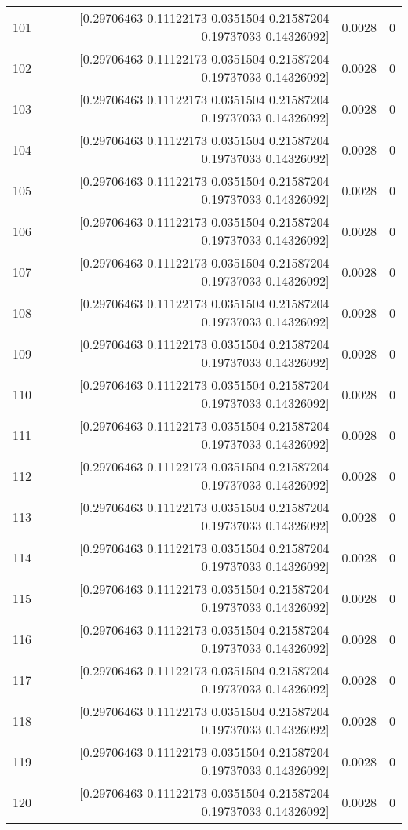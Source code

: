 \begin{longtable}{lrrr}
101 & [0.29706463 0.11122173 0.0351504  0.21587204 0.19737033 0.14326092] & 0.0028 & 0 \\
102 & [0.29706463 0.11122173 0.0351504  0.21587204 0.19737033 0.14326092] & 0.0028 & 0 \\
103 & [0.29706463 0.11122173 0.0351504  0.21587204 0.19737033 0.14326092] & 0.0028 & 0 \\
104 & [0.29706463 0.11122173 0.0351504  0.21587204 0.19737033 0.14326092] & 0.0028 & 0 \\
105 & [0.29706463 0.11122173 0.0351504  0.21587204 0.19737033 0.14326092] & 0.0028 & 0 \\
106 & [0.29706463 0.11122173 0.0351504  0.21587204 0.19737033 0.14326092] & 0.0028 & 0 \\
107 & [0.29706463 0.11122173 0.0351504  0.21587204 0.19737033 0.14326092] & 0.0028 & 0 \\
108 & [0.29706463 0.11122173 0.0351504  0.21587204 0.19737033 0.14326092] & 0.0028 & 0 \\
109 & [0.29706463 0.11122173 0.0351504  0.21587204 0.19737033 0.14326092] & 0.0028 & 0 \\
110 & [0.29706463 0.11122173 0.0351504  0.21587204 0.19737033 0.14326092] & 0.0028 & 0 \\
111 & [0.29706463 0.11122173 0.0351504  0.21587204 0.19737033 0.14326092] & 0.0028 & 0 \\
112 & [0.29706463 0.11122173 0.0351504  0.21587204 0.19737033 0.14326092] & 0.0028 & 0 \\
113 & [0.29706463 0.11122173 0.0351504  0.21587204 0.19737033 0.14326092] & 0.0028 & 0 \\
114 & [0.29706463 0.11122173 0.0351504  0.21587204 0.19737033 0.14326092] & 0.0028 & 0 \\
115 & [0.29706463 0.11122173 0.0351504  0.21587204 0.19737033 0.14326092] & 0.0028 & 0 \\
116 & [0.29706463 0.11122173 0.0351504  0.21587204 0.19737033 0.14326092] & 0.0028 & 0 \\
117 & [0.29706463 0.11122173 0.0351504  0.21587204 0.19737033 0.14326092] & 0.0028 & 0 \\
118 & [0.29706463 0.11122173 0.0351504  0.21587204 0.19737033 0.14326092] & 0.0028 & 0 \\
119 & [0.29706463 0.11122173 0.0351504  0.21587204 0.19737033 0.14326092] & 0.0028 & 0 \\
120 & [0.29706463 0.11122173 0.0351504  0.21587204 0.19737033 0.14326092] & 0.0028 & 0 \\

\end{longtable}
